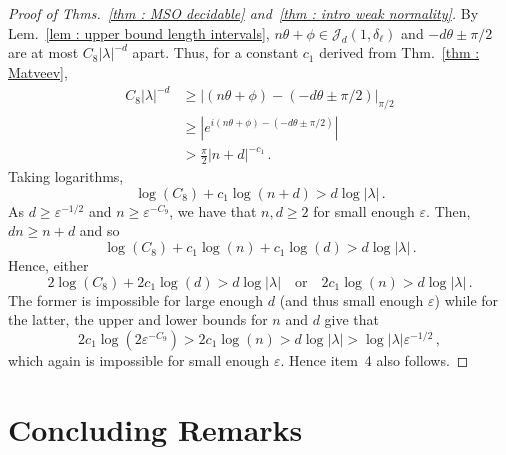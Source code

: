 \documentclass[a4paper,UKenglish,cleveref, autoref, thm-restate]{lipics-v2021}
\begin{document}
\begin{proof}[Proof of Thms.~\ref{thm : MSO decidable} and~\ref{thm : intro weak normality}]
    By Lem.~\ref{lem : upper bound length intervals}, $n\theta + \phi \in \mathcal{J}_d(1, \delta_\ell)$ and $-d\theta \pm \pi/2$ are at most $C_8|\lambda|^{-d}$ apart.
    Thus, for a constant $c_1$ derived from Thm.~\ref{thm : Matveev},
    \begin{align*}
        C_8|\lambda|^{-d} &\ge  |(n\theta + \phi) - (-d\theta \pm \pi/2)|_{\pi/2} \\
        &\ge |e^{i(n\theta + \phi) - (-d\theta \pm \pi/2)}| \\
        &> \frac{\pi}{2}|n + d|^{-c_1} \, .
    \end{align*}
    Taking logarithms,
    \begin{equation*}
        \log(C_8) + c_1\log(n + d) > d\log|\lambda| \, .
    \end{equation*}
    As $d \ge \varepsilon^{-1/2}$ and $n \ge \varepsilon^{-C_9}$, we have that $n, d \ge 2$ for small enough $\varepsilon$.
    Then, $dn\ge n+d$ and so 
    \begin{equation*}
        \log(C_8) + c_1\log(n)+c_1\log(d) > d\log|\lambda| \, .
    \end{equation*}
    Hence, either 
    \begin{equation*}
        2\log(C_8) +2c_1\log(d) > d\log|\lambda| \quad\text{or} \quad
        2c_1\log(n) > d\log|\lambda| \, .
    \end{equation*}
    The former is impossible for large enough $d$ (and thus small enough $\varepsilon$) while for the latter, the upper and lower bounds for $n$ and $d$ give that
    \begin{equation*}
         2c_1\log(2\varepsilon^{-C_9}) > 2c_1\log(n) > d\log|\lambda| > 
         \log|\lambda|\varepsilon^{-1/2} \, ,
    \end{equation*}
    which again is impossible for small enough $\varepsilon$.
    Hence item~4 also follows.\qedhere

  \end{proof}

  \section{Concluding Remarks}
  \label{sec : conclusion}
\end{document}
